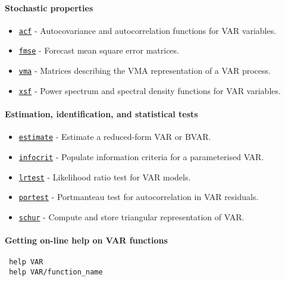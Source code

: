  \paragraph{Stochastic properties}
 
 \begin{itemize}
 \item
   \href{VAR/acf}{\texttt{acf}} - Autocovariance and autocorrelation
   functions for VAR variables.
 \item
   \href{VAR/fmse}{\texttt{fmse}} - Forecast mean square error matrices.
 \item
   \href{VAR/vma}{\texttt{vma}} - Matrices describing the VMA
   representation of a VAR process.
 \item
   \href{VAR/xsf}{\texttt{xsf}} - Power spectrum and spectral density
   functions for VAR variables.
 \end{itemize}
 
 \paragraph{Estimation, identification, and statistical tests}
 
 \begin{itemize}
 \item
   \href{VAR/estimate}{\texttt{estimate}} - Estimate a reduced-form VAR
   or BVAR.
 \item
   \href{VAR/infocrit}{\texttt{infocrit}} - Populate information criteria
   for a parameterised VAR.
 \item
   \href{VAR/lrtest}{\texttt{lrtest}} - Likelihood ratio test for VAR
   models.
 \item
   \href{VAR/portest}{\texttt{portest}} - Portmanteau test for
   autocorrelation in VAR residuals.
 \item
   \href{VAR/schur}{\texttt{schur}} - Compute and store triangular
   representation of VAR.
 \end{itemize}
 
 \paragraph{Getting on-line help on VAR functions}
 
 \begin{verbatim}
 help VAR
 help VAR/function_name
 \end{verbatim}



